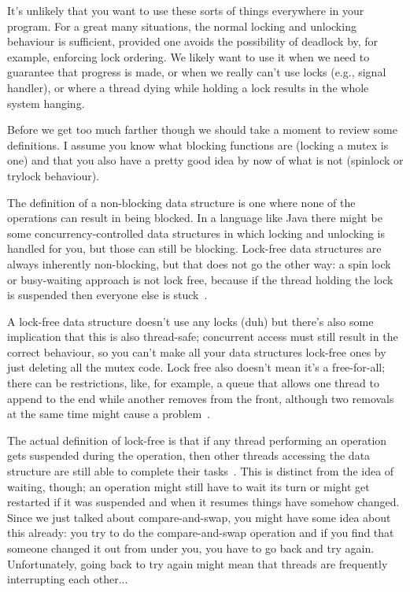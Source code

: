 \documentclass[a4paper]{report}
\begin{document}
It's unlikely that you want to use these sorts of things everywhere in your program. For a great many situations, the normal locking and unlocking behaviour is sufficient, provided one avoids the possibility of deadlock by, for example, enforcing lock ordering. We likely want to use it when we need to guarantee that progress is made, or when we really can't use locks (e.g., signal handler), or where a thread dying while holding a lock results in the whole system hanging.

Before we get too much farther though we should take a moment to review some definitions. I assume you know what blocking functions are (locking a mutex is one) and that you also have a pretty good idea by now of what is not (spinlock or trylock behaviour). 

The definition of a non-blocking data structure is one where none of the operations can result in being blocked. In a language like Java there might be some concurrency-controlled data structures in which locking and unlocking is handled for you, but those can still be blocking. Lock-free data structures are always inherently non-blocking, but that does not go the other way: a spin lock or busy-waiting approach is not lock free, because if the thread holding the lock is suspended then everyone else is stuck~\cite{nblfwf}.

A lock-free data structure doesn't use any locks (duh) but there's also some implication that this is also thread-safe; concurrent access must still result in the correct behaviour, so you can't make all your data structures lock-free ones by just deleting all the mutex code. Lock free also doesn't mean it's a free-for-all; there can be restrictions, like, for example, a queue that allows one thread to append to the end while another removes from the front, although two removals at the same time might cause a problem~\cite{nblfwf}.

The actual definition of lock-free is that if any thread performing an operation gets suspended during the operation, then other threads accessing the data structure are still able to complete their tasks~\cite{nblfwf}. This is distinct from the idea of waiting, though; an operation might still have to wait its turn or might get restarted if it was suspended and when it resumes things have somehow changed. Since we just talked about compare-and-swap, you might have some idea about this already: you try to do the compare-and-swap operation and if you find that someone changed it out from under you, you have to go back and try again. Unfortunately, going back to try again might mean that threads are frequently interrupting each other...
\end{document}
